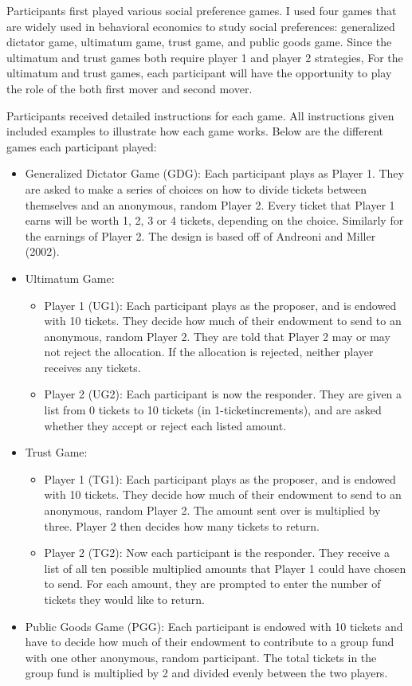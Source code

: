 \documentclass{article}
\begin{document}
Participants first played various social preference games. I used four games that are widely used in behavioral economics to study social preferences: generalized dictator game, ultimatum game, trust game, and public goods game. {\color{red}Since the ultimatum and trust games both require player 1 and player 2 strategies, For the ultimatum and trust games, each participant will have the opportunity to play the role of the both first mover and second mover. }


Participants received detailed instructions for each game. All instructions given included examples to illustrate how each game works. Below are the different games each participant played: 

\begin{itemize}

\item{Generalized Dictator Game (GDG)}:  Each participant plays as Player 1. They are asked to make a series of choices on how to divide tickets between themselves and an anonymous, random Player 2. Every ticket that Player 1 earns will be worth 1, 2, 3 or 4 tickets, depending on the choice. Similarly for the earnings of Player 2. The design is based off of Andreoni and Miller (2002).
\item{Ultimatum Game}: 
	\begin{itemize}
		\item{Player 1 (UG1)}: Each participant plays as the proposer, and is endowed with 10 tickets. They decide how much of their endowment to send to an anonymous, random Player 2. They are told that Player 2 may or may not reject the allocation. If the allocation is rejected, neither player receives any tickets.
		\item{Player 2 (UG2)}: Each participant is now the responder. They are given a list from 0 tickets to 10 tickets (in 1-ticketincrements), and are asked whether they accept or reject each listed amount.
	\end{itemize}
\item{Trust Game}:
	\begin{itemize}
		\item{Player 1 (TG1)}: Each participant plays as the proposer, and is endowed with 10 tickets. They decide how much of their endowment to send to an anonymous, random Player 2. The amount sent over is multiplied by three. Player 2 then decides how many tickets to return. 
		\item{Player 2 (TG2)}: Now each participant is the responder. They receive a list of all ten possible multiplied amounts that Player 1 could have chosen to send. For each amount, they are prompted to enter the number of tickets they would like to return.
	\end{itemize}
\item{Public Goods Game (PGG)}: Each participant is endowed with 10 tickets and have to decide how much of their endowment to contribute to a group fund with one other anonymous, random participant. The total tickets in the group fund is multiplied by 2 and divided evenly between the two players.

\end{itemize}
\end{document}
